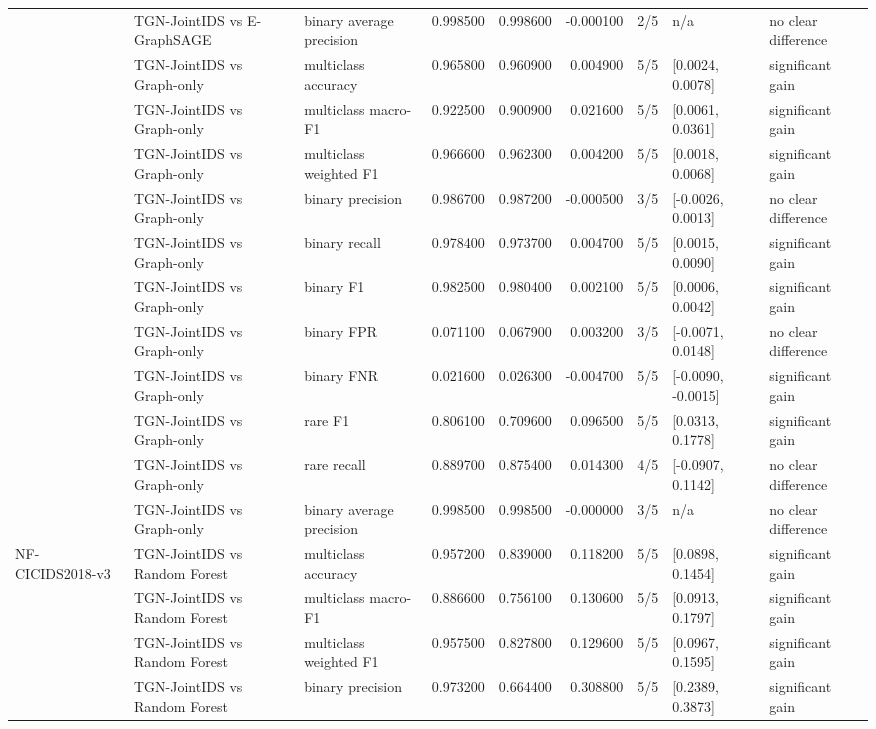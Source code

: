 \begin{table}
\begin{tabular}{lllrrrlll}
 & TGN-JointIDS vs E-GraphSAGE & binary average precision & 0.998500 & 0.998600 & -0.000100 & 2/5 & n/a & no clear difference \\
 & TGN-JointIDS vs Graph-only & multiclass accuracy & 0.965800 & 0.960900 & 0.004900 & 5/5 & [0.0024, 0.0078] & significant gain \\
 & TGN-JointIDS vs Graph-only & multiclass macro-F1 & 0.922500 & 0.900900 & 0.021600 & 5/5 & [0.0061, 0.0361] & significant gain \\
 & TGN-JointIDS vs Graph-only & multiclass weighted F1 & 0.966600 & 0.962300 & 0.004200 & 5/5 & [0.0018, 0.0068] & significant gain \\
 & TGN-JointIDS vs Graph-only & binary precision & 0.986700 & 0.987200 & -0.000500 & 3/5 & [-0.0026, 0.0013] & no clear difference \\
 & TGN-JointIDS vs Graph-only & binary recall & 0.978400 & 0.973700 & 0.004700 & 5/5 & [0.0015, 0.0090] & significant gain \\
 & TGN-JointIDS vs Graph-only & binary F1 & 0.982500 & 0.980400 & 0.002100 & 5/5 & [0.0006, 0.0042] & significant gain \\
 & TGN-JointIDS vs Graph-only & binary FPR & 0.071100 & 0.067900 & 0.003200 & 3/5 & [-0.0071, 0.0148] & no clear difference \\
 & TGN-JointIDS vs Graph-only & binary FNR & 0.021600 & 0.026300 & -0.004700 & 5/5 & [-0.0090, -0.0015] & significant gain \\
 & TGN-JointIDS vs Graph-only & rare F1 & 0.806100 & 0.709600 & 0.096500 & 5/5 & [0.0313, 0.1778] & significant gain \\
 & TGN-JointIDS vs Graph-only & rare recall & 0.889700 & 0.875400 & 0.014300 & 4/5 & [-0.0907, 0.1142] & no clear difference \\
 & TGN-JointIDS vs Graph-only & binary average precision & 0.998500 & 0.998500 & -0.000000 & 3/5 & n/a & no clear difference \\
\cline{1-9}
\multirow[t]{55}{*}{NF-CICIDS2018-v3} & TGN-JointIDS vs Random Forest & multiclass accuracy & 0.957200 & 0.839000 & 0.118200 & 5/5 & [0.0898, 0.1454] & significant gain \\
 & TGN-JointIDS vs Random Forest & multiclass macro-F1 & 0.886600 & 0.756100 & 0.130600 & 5/5 & [0.0913, 0.1797] & significant gain \\
 & TGN-JointIDS vs Random Forest & multiclass weighted F1 & 0.957500 & 0.827800 & 0.129600 & 5/5 & [0.0967, 0.1595] & significant gain \\
 & TGN-JointIDS vs Random Forest & binary precision & 0.973200 & 0.664400 & 0.308800 & 5/5 & [0.2389, 0.3873] & significant gain \\

\end{tabular}
\end{table}
